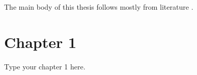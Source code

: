 
The main body of this thesis follows mostly from literature \cite{Losev}.
\section{Chapter 1}

Type your chapter 1 here.
